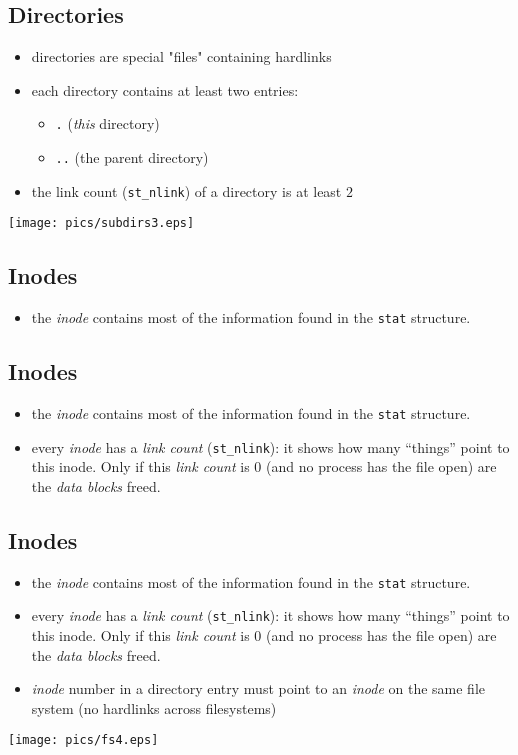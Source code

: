 \documentclass[xga]{xdvislides}
\begin{document}
\subsection{Directories}
\begin{itemize}
	\item directories are special "files" containing hardlinks
	\item each directory contains at least two entries:
		\begin{itemize}
			\item {\tt .} ({\em this} directory)
			\item {\tt ..} (the parent directory)
		\end{itemize}
	\item the link count ({\tt st\_nlink}) of a directory is at least $2$
\end{itemize}
\texttt{[image: pics/subdirs3.eps]}

\subsection{Inodes}
\begin{itemize}
	\item the {\em inode} contains most of the information found in the {\tt stat}
		structure.
\end{itemize}

\subsection{Inodes}
\begin{itemize}
	\item the {\em inode} contains most of the information found in the {\tt stat}
		structure.
	\item every {\em inode} has a {\em link count} ({\tt st\_nlink}):  it
		shows how many ``things'' point to this inode.  Only if this
		{\em link count} is 0 (and no process has the file open) are the
		{\em data blocks} freed.
\end{itemize}

\subsection{Inodes}
\begin{itemize}
	\item the {\em inode} contains most of the information found in the {\tt stat}
		structure.
	\item every {\em inode} has a {\em link count} ({\tt st\_nlink}):  it
		shows how many ``things'' point to this inode.  Only if this
		{\em link count} is 0 (and no process has the file open) are the
		{\em data blocks} freed.
	\item {\em inode} number in a directory entry must point to an {\em inode}
		on the same file system (no hardlinks across filesystems)
\end{itemize}
\texttt{[image: pics/fs4.eps]}
\end{document}
